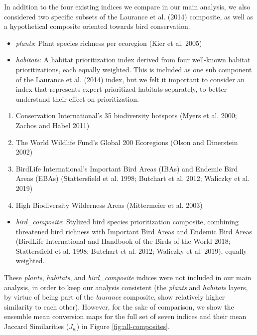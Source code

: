 \documentclass[
]{article}
\providecommand{\tightlist}{%
  \setlength{\itemsep}{0pt}\setlength{\parskip}{0pt}}
\begin{document}
In addition to the four existing indices we compare in our main analysis, we also considered two specific subsets of the Laurance et al. (2014) composite, as well as a hypothetical composite oriented towards bird conservation.

\begin{itemize}
\item
  \emph{plants}: Plant species richness per ecoregion (Kier et al. 2005)
\item
  \emph{habitats}: A habitat prioritization index derived from four well-known habitat prioritizations, each equally weighted. This is included as one sub component of the Laurance et al. (2014) index, but we felt it important to consider an index that represents expert-prioritized habitats separately, to better understand their effect on prioritization.
\end{itemize}

\begin{enumerate}
\def\labelenumi{\arabic{enumi}.}
\tightlist
\item
  Conservation International's 35 biodiversity hotspots (Myers et al. 2000; Zachos and Habel 2011)
\item
  The World Wildlife Fund's Global 200 Ecoregions (Olson and Dinerstein 2002)
\item
  BirdLife International's Important Bird Areas (IBAs) and Endemic Bird Areas (EBAs) (Stattersfield et al. 1998; Butchart et al. 2012; Waliczky et al. 2019)
\item
  High Biodiversity Wilderness Areas (Mittermeier et al. 2003)
\end{enumerate}

\begin{itemize}
\tightlist
\item
  \emph{bird\_composite}: Stylized bird species prioritization composite, combining threatened bird richness with Important Bird Areas and Endemic Bird Areas (BirdLife International and Handbook of the Birds of the World 2018; Stattersfield et al. 1998; Butchart et al. 2012; Waliczky et al. 2019), equally-weighted.
\end{itemize}

These \emph{plants}, \emph{habitats}, and \emph{bird\_composite} indices were not included in our main analysis, in order to keep our analysis consistent (the \emph{plants} and \emph{habitats} layers, by virtue of being part of the \emph{laurance} composite, show relatively higher similarity to each other). However, for the sake of comparison, we show the ensemble mean conversion maps for the full set of seven indices and their mean Jaccard Similarities (\(J_w\)) in Figure \ref{fig:all-composites}.
\end{document}
